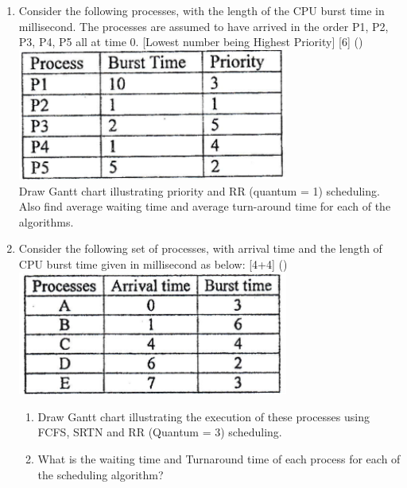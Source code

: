 \documentclass[12pt]{article}
\begin{document}
\begin{enumerate}
			\item Consider the following processes, with the length of the CPU burst time in millisecond. The processes are assumed to have arrived in the order P1, P2, P3, P4, P5 all at time 0. [Lowest number being Highest Priority] \hfill [6] ()\\
			\includegraphics[width=3.5in]{./pics/os_11}\\
			Draw Gantt chart illustrating priority and RR (quantum = 1) scheduling. Also find average waiting time and average turn-around time for each of the algorithms.
			
			\item Consider the following set of processes, with arrival time and the length of CPU burst time given in millisecond as below: \hfill [4+4] ()\\
			\includegraphics[width=3.5in]{./pics/os_9}
			\begin{enumerate}[noitemsep, topsep = 0pt, label = \alph*.]
				\item Draw Gantt chart illustrating the execution of these processes using FCFS, SRTN and RR (Quantum = 3) scheduling.
				\item What is the waiting time and Turnaround time of each process for each of the scheduling algorithm?
			\end{enumerate}
			

\end{enumerate}
\end{document}

